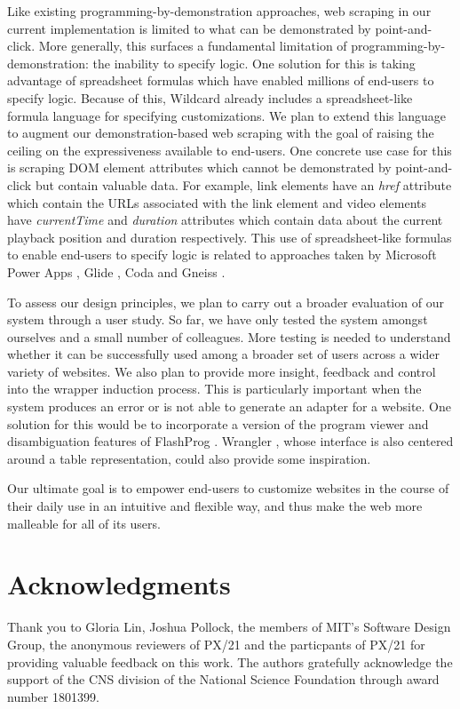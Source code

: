 \documentclass[sigconf,10pt]{acmart}
\begin{document}
Like existing programming-by-demonstration approaches, web scraping in
our current implementation is limited to what can be demonstrated by
point-and-click. More generally, this surfaces a fundamental limitation
of programming-by-demonstration: the inability to specify logic. One
solution for this is taking advantage of spreadsheet formulas which have
enabled millions of end-users to specify logic. Because of this,
Wildcard already includes a spreadsheet-like formula language for
specifying customizations. We plan to extend this language to augment
our demonstration-based web scraping with the goal of raising the
ceiling on the expressiveness available to end-users. One concrete use
case for this is scraping DOM element attributes which cannot be
demonstrated by point-and-click but contain valuable data. For example,
link elements have an \emph{href} attribute which contain the URLs
associated with the link element and video elements have
\emph{currentTime} and \emph{duration} attributes which contain data
about the current playback position and duration respectively. This use
of spreadsheet-like formulas to enable end-users to specify logic is
related to approaches taken by Microsoft Power Apps \citep{zotero-94},
Glide \citep{zotero-108}, Coda \citep{zotero-110} and Gneiss
\citep{chang2014}.

To assess our design principles, we plan to carry out a broader
evaluation of our system through a user study. So far, we have only
tested the system amongst ourselves and a small number of colleagues.
More testing is needed to understand whether it can be successfully used
among a broader set of users across a wider variety of websites. We also
plan to provide more insight, feedback and control into the wrapper
induction process. This is particularly important when the system
produces an error or is not able to generate an adapter for a website.
One solution for this would be to incorporate a version of the program
viewer and disambiguation features of FlashProg \citep{mayer2015}.
Wrangler \citep{kandel2011}, whose interface is also centered around a
table representation, could also provide some inspiration.

Our ultimate goal is to empower end-users to customize websites in the
course of their daily use in an intuitive and flexible way, and thus
make the web more malleable for all of its users.

\section*{Acknowledgments}

Thank you to Gloria Lin, Joshua Pollock, the members of MIT's Software
Design Group, the anonymous reviewers of PX/21 and the particpants of
PX/21 for providing valuable feedback on this work. The authors
gratefully acknowledge the support of the CNS division of the National
Science Foundation through award number 1801399.




\end{document}
